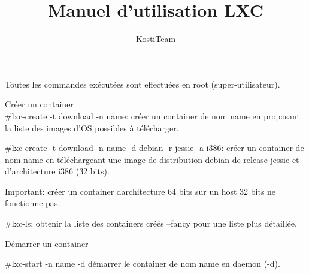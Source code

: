 \documentclass[twoside]{article}
\author{KostiTeam}
\title{Manuel d'utilisation LXC}
\begin{document}
\maketitle

Toutes les commandes ex\'ecut\'ees sont effectu\'ees en root (super-utilisateur).

Cr\'eer un container\\
\#lxc-create -t download -n name: cr\'eer un container de nom name en proposant la liste des images d’OS possibles \`a t\'el\'echarger. 

\#lxc-create -t download -n name -d debian -r jessie -a i386: cr\'eer un container de nom name en t\'el\'echargeant une image de distribution debian de release jessie et d’architecture i386 (32 bits).
  
Important: cr\'eer un container d\’architecture 64 bits sur un host 32 bits ne fonctionne pas.

\#lxc-ls: obtenir la liste des containers cr\'e\'es –fancy pour une liste plus d\'etaill\'ee.
  
D\'emarrer un container

\#lxc-start -n name  -d d\'emarrer le container de nom name en daemon (-d).
\end{document}
